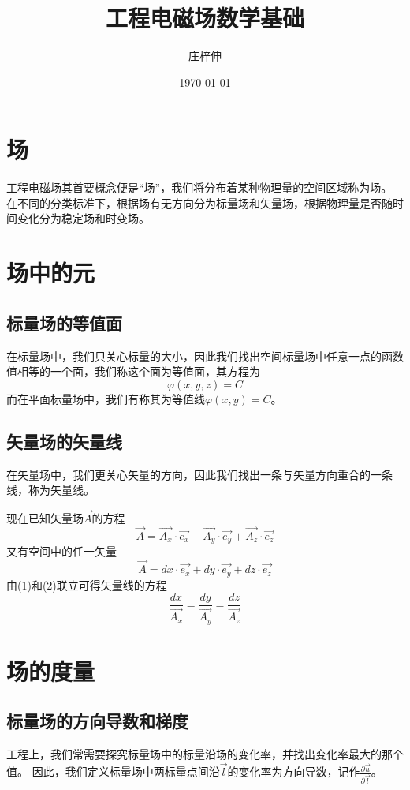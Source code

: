 \documentclass[UTF8]{article}
\title{\heiti 工程电磁场数学基础}
\author{\kaishu 庄梓伸}
\date{\kaishu \today}
\begin{document}
\maketitle

\section{场} %
工程电磁场其首要概念便是“场”，我们将分布着某种物理量的空间区域称为场。
在不同的分类标准下，根据场有无方向分为标量场和矢量场，根据物理量是否随时间变化分为稳定场和时变场。

\section{场中的元}
\subsection{标量场的等值面}
在标量场中，我们只关心标量的大小，因此我们找出空间标量场中任意一点的函数值相等的一个面，我们称这个面为等值面，其方程为
\begin{equation}
    \varphi (x, y, z)=C
\end{equation}
而在平面标量场中，我们有称其为等值线$\varphi (x, y)=C$。

\subsection{矢量场的矢量线}
在矢量场中，我们更关心矢量的方向，因此我们找出一条与矢量方向重合的一条线，称为矢量线。

现在已知矢量场$\vec{A}$的方程
\begin{equation}
    \vec{A} = \vec{A_{x}}\cdot \vec{e_{x}}+\vec{A_{y}}\cdot \vec{e_{y}}+\vec{A_{z}}\cdot \vec{e_{z}}
\end{equation}
又有空间中的任一矢量
\begin{equation}
    \vec{A} = dx\cdot \vec{e_{x}}+dy\cdot \vec{e_{y}}+dz\cdot \vec{e_{z}}
\end{equation}
由(1)和(2)联立可得矢量线的方程
\begin{equation}
    \frac{dx}{\vec{A_{x}}}=\frac{dy}{\vec{A_{y}}}=\frac{dz}{\vec{A_{z}}}
\end{equation}

\section{场的度量}
\subsection{标量场的方向导数和梯度}
工程上，我们常需要探究标量场中的标量沿场的变化率，并找出变化率最大的那个值。
因此，我们定义标量场中两标量点间沿$\vec{l}$的变化率为{\heiti 方向导数}，记作$\frac{\partial \vec u}{\partial \vec l}$。
\end{document}
